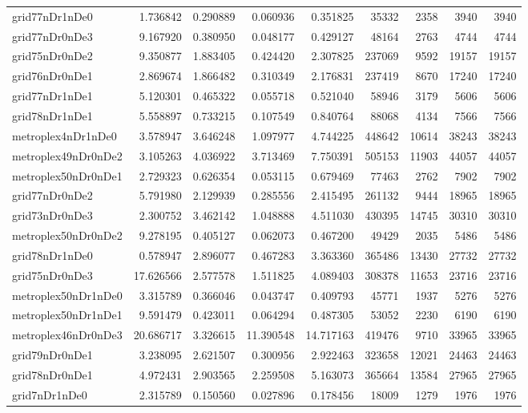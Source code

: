 \documentclass[../../../thesis.tex]{subfiles}
\begin{document}
\begin{longtable}{|l|r|r|r|r|r|r|r|r|}
grid77nDr1nDe0 & 1.736842 & 0.290889 & 0.060936 & 0.351825 & 35332 & 2358 & 3940 & 3940 \\
grid77nDr0nDe3 & 9.167920 & 0.380950 & 0.048177 & 0.429127 & 48164 & 2763 & 4744 & 4744 \\
grid75nDr0nDe2 & 9.350877 & 1.883405 & 0.424420 & 2.307825 & 237069 & 9592 & 19157 & 19157 \\
grid76nDr0nDe1 & 2.869674 & 1.866482 & 0.310349 & 2.176831 & 237419 & 8670 & 17240 & 17240 \\
grid77nDr1nDe1 & 5.120301 & 0.465322 & 0.055718 & 0.521040 & 58946 & 3179 & 5606 & 5606 \\
grid78nDr1nDe1 & 5.558897 & 0.733215 & 0.107549 & 0.840764 & 88068 & 4134 & 7566 & 7566 \\
metroplex4nDr1nDe0 & 3.578947 & 3.646248 & 1.097977 & 4.744225 & 448642 & 10614 & 38243 & 38243 \\
metroplex49nDr0nDe2 & 3.105263 & 4.036922 & 3.713469 & 7.750391 & 505153 & 11903 & 44057 & 44057 \\
metroplex50nDr0nDe1 & 2.729323 & 0.626354 & 0.053115 & 0.679469 & 77463 & 2762 & 7902 & 7902 \\
grid77nDr0nDe2 & 5.791980 & 2.129939 & 0.285556 & 2.415495 & 261132 & 9444 & 18965 & 18965 \\
grid73nDr0nDe3 & 2.300752 & 3.462142 & 1.048888 & 4.511030 & 430395 & 14745 & 30310 & 30310 \\
metroplex50nDr0nDe2 & 9.278195 & 0.405127 & 0.062073 & 0.467200 & 49429 & 2035 & 5486 & 5486 \\
grid78nDr1nDe0 & 0.578947 & 2.896077 & 0.467283 & 3.363360 & 365486 & 13430 & 27732 & 27732 \\
grid75nDr0nDe3 & 17.626566 & 2.577578 & 1.511825 & 4.089403 & 308378 & 11653 & 23716 & 23716 \\
metroplex50nDr1nDe0 & 3.315789 & 0.366046 & 0.043747 & 0.409793 & 45771 & 1937 & 5276 & 5276 \\
metroplex50nDr1nDe1 & 9.591479 & 0.423011 & 0.064294 & 0.487305 & 53052 & 2230 & 6190 & 6190 \\
metroplex46nDr0nDe3 & 20.686717 & 3.326615 & 11.390548 & 14.717163 & 419476 & 9710 & 33965 & 33965 \\
grid79nDr0nDe1 & 3.238095 & 2.621507 & 0.300956 & 2.922463 & 323658 & 12021 & 24463 & 24463 \\
grid78nDr0nDe1 & 4.972431 & 2.903565 & 2.259508 & 5.163073 & 365664 & 13584 & 27965 & 27965 \\
grid7nDr1nDe0 & 2.315789 & 0.150560 & 0.027896 & 0.178456 & 18009 & 1279 & 1976 & 1976 \\

\end{longtable}
\end{document}
